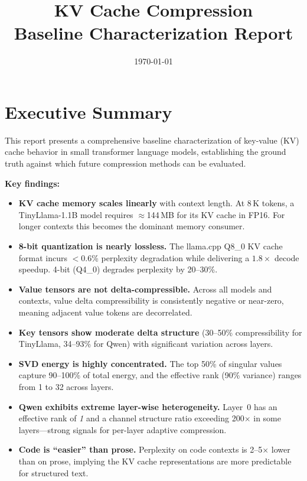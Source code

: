 \documentclass[11pt,a4paper]{article}
\title{\textbf{KV Cache Compression}\\[4pt]
       \large Baseline Characterization Report}
\author{}
\date{\today}
\begin{document}
\maketitle
\tableofcontents
\newpage

\section{Executive Summary}

This report presents a comprehensive baseline characterization of key-value
(KV) cache behavior in small transformer language models, establishing the
ground truth against which future compression methods can be evaluated.

\textbf{Key findings:}

\begin{itemize}[itemsep=2pt]
  \item \textbf{KV cache memory scales linearly} with context length. At
        8\,K tokens, a TinyLlama-1.1B model requires $\approx$144\,MB for
        its KV cache in FP16. For longer contexts this becomes the dominant
        memory consumer.
  \item \textbf{8-bit quantization is nearly lossless.} The llama.cpp
        Q8\_0 KV cache format incurs $<$0.6\% perplexity degradation
        while delivering a $1.8\times$ decode speedup. 4-bit (Q4\_0)
        degrades perplexity by 20--30\%.
  \item \textbf{Value tensors are not delta-compressible.} Across all
        models and contexts, value delta compressibility is consistently
        negative or near-zero, meaning adjacent value tokens are
        decorrelated.
  \item \textbf{Key tensors show moderate delta structure} (30--50\%
        compressibility for TinyLlama, 34--93\% for Qwen) with significant
        variation across layers.
  \item \textbf{SVD energy is highly concentrated.} The top 50\% of
        singular values capture 90--100\% of total energy, and the effective
        rank (90\% variance) ranges from 1 to 32 across layers.
  \item \textbf{Qwen exhibits extreme layer-wise heterogeneity.} Layer~0
        has an effective rank of \emph{1} and a channel structure ratio
        exceeding 200$\times$ in some layers---strong signals for
        per-layer adaptive compression.
  \item \textbf{Code is ``easier'' than prose.} Perplexity on code
        contexts is 2--5$\times$ lower than on prose, implying the KV
        cache representations are more predictable for structured text.
\end{itemize}
\end{document}

